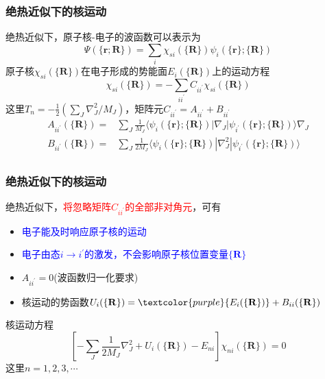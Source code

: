 {\frame
{
	\frametitle{绝热近似下的核运动}
	绝热近似下，原子核-电子的波函数可以表示为
	\begin{displaymath}
		\Psi(\{\mathbf{r};\mathbf{R}\})=\sum_i\chi_{si}(\{\mathbf{R}\})\psi_i(\{\mathbf{r}\};\{\mathbf{R}\})
	\end{displaymath}
	原子核$\chi_{si}(\{\mathbf{R}\})$在电子形成的势能面$E_i(\{\mathbf{R}\})$上的运动方程
	\begin{displaymath}
		[T_N+E_i(\{\mathbf{R}\})-E_s]\chi_{si}(\{\mathbf{R}\})=-\sum_{ii^{\prime}}C_{ii^{\prime}}\chi_{si}(\{\mathbf{R}\})
	\end{displaymath}
	这里$T_n=-\frac12(\sum\limits_J\nabla_J^2/M_J)$，矩阵元$C_{ii^{\prime}}=A_{ii^{\prime}}+B_{ii^{\prime}}$
	\begin{displaymath}
		\begin{aligned}
			A_{ii^{\prime}}(\{\mathbf{R}\})=&\sum_J\frac1{M_J}\langle\psi_i(\{\mathbf{r}\};\{\mathbf{R}\})|\nabla_J|\psi_{i^{\prime}}(\{\mathbf{r}\};\{\mathbf{R}\})\rangle\nabla_J\\
			B_{ii^{\prime}}(\{\mathbf{R}\})=&\sum_J\frac1{2M_J}\langle\psi_i(\{\mathbf{r}\};\{\mathbf{R}\})|\nabla_J^2|\psi_{i^{\prime}}(\{\mathbf{r}\};\{\mathbf{R}\})\rangle\\
		\end{aligned}
	\end{displaymath}
	\fontsize{8.2pt}{4.2pt}
}

\frame
{
	\frametitle{绝热近似下的核运动}
	绝热近似下，\textcolor{red}{将忽略矩阵$C_{ii^{\prime}}$的全部非对角元}，可有
	\begin{itemize}
		\item \textcolor{blue}{电子能及时响应原子核的运动}
		\item \textcolor{blue}{电子由态$i\rightarrow i^{\prime}$的激发，不会影响原子核位置变量${\{\mathbf{R}\}}$}
		\item $A_{ii^{\prime}}=0$(波函数归一化要求)
		\item 核运动的势函数$U_i(\{\mathbf{R}\})=\textcolor{purple}{E_i(\{\mathbf{R}\})}+B_{ii}(\{\mathbf{R}\})$
	\end{itemize}
	核运动方程
	\begin{displaymath}
		\left[ -\sum_J\frac1{2M_J}\nabla_J^2+U_i(\{\mathbf{R}\})-E_{ni} \right]\chi_{ni}(\{\mathbf{R}\})=0
	\end{displaymath}
这里$n=1,2,3,\cdots$

}}
